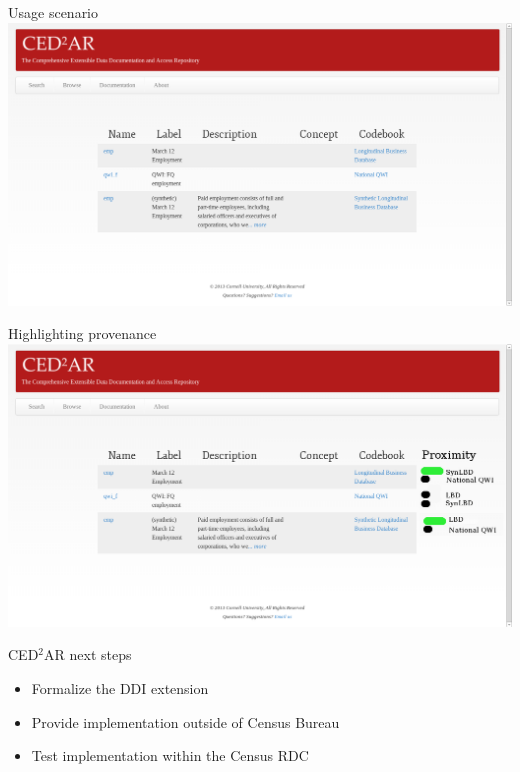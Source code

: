\begin{frame}{Usage scenario}
\includegraphics[width=1.1\textwidth]{Screenshot_2013-11-04_12:43:01.png}
\end{frame}
\begin{frame}{Highlighting provenance}
\includegraphics[width=1.1\textwidth]{Screenshot_2013-11-04_12:43:01-prov.png}
\end{frame}


\begin{frame}{CED$^2$AR next steps}
\begin{itemize}[<+->]
\item Formalize the DDI extension
\item Provide implementation outside of Census Bureau
\item Test implementation within the Census RDC
\end{itemize}
\end{frame}

